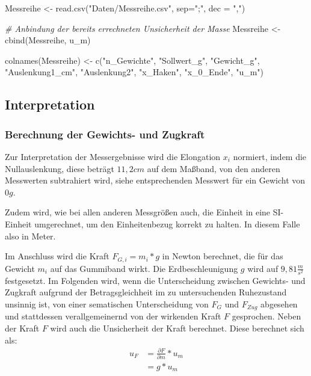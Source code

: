 \documentclass[
]{article}
\newenvironment{Shaded}{\begin{snugshade}}{\end{snugshade}}
\newcommand{\AttributeTok}[1]{\textcolor[rgb]{0.77,0.63,0.00}{#1}}
\newcommand{\CommentTok}[1]{\textcolor[rgb]{0.56,0.35,0.01}{\textit{#1}}}
\newcommand{\FunctionTok}[1]{\textcolor[rgb]{0.00,0.00,0.00}{#1}}
\newcommand{\NormalTok}[1]{#1}
\newcommand{\OtherTok}[1]{\textcolor[rgb]{0.56,0.35,0.01}{#1}}
\newcommand{\StringTok}[1]{\textcolor[rgb]{0.31,0.60,0.02}{#1}}
\begin{document}
\begin{Shaded}
\begin{Highlighting}[]
\NormalTok{Messreihe }\OtherTok{\textless{}{-}} \FunctionTok{read.csv}\NormalTok{(}\StringTok{"Daten/Messreihe.csv"}\NormalTok{, }\AttributeTok{sep=}\StringTok{";"}\NormalTok{, }\AttributeTok{dec =} \StringTok{","}\NormalTok{)}

\CommentTok{\# Anbindung der bereits errechneten Unsicherheit der Masse}
\NormalTok{Messreihe }\OtherTok{\textless{}{-}} \FunctionTok{cbind}\NormalTok{(Messreihe, u\_m)}

\FunctionTok{colnames}\NormalTok{(Messreihe) }\OtherTok{\textless{}{-}} \FunctionTok{c}\NormalTok{(}\StringTok{"n\_Gewichte"}\NormalTok{, }\StringTok{"Sollwert\_g"}\NormalTok{, }\StringTok{"Gewicht\_g"}\NormalTok{, }\StringTok{"Auslenkung1\_cm"}\NormalTok{,  }\StringTok{"Auslenkung2"}\NormalTok{, }\StringTok{"x\_Haken"}\NormalTok{, }\StringTok{"x\_0\_Ende"}\NormalTok{, }\StringTok{"u\_m"}\NormalTok{)}
\end{Highlighting}
\end{Shaded}

\hypertarget{interpretation}{%
\subsection{Interpretation}\label{interpretation}}

\hypertarget{berechnung-der-gewichts--und-zugkraft}{%
\subsubsection{Berechnung der Gewichts- und
Zugkraft}\label{berechnung-der-gewichts--und-zugkraft}}

Zur Interpretation der Messergebnisse wird die Elongation \(x_i\)
normiert, indem die Nullauslenkung, diese beträgt \(11,2 cm\) auf dem
Maßband, von den anderen Messwerten subtrahiert wird, siehe
entsprechenden Messwert für ein Gewicht von \(0g\).

Zudem wird, wie bei allen anderen Messgrößen auch, die Einheit in eine
SI-Einheit umgerechnet, um den Einheitenbezug korrekt zu halten. In
diesem Falle also in Meter.

Im Anschluss wird die Kraft \(F_{G,i} = m_i * g\) in Newton berechnet,
die für das Gewicht \(m_i\) auf das Gummiband wirkt. Die
Erdbeschleunigung \(g\) wird auf \(9,81\frac{m}{s^2}\) festgesetzt. Im
Folgenden wird, wenn die Unterscheidung zwischen Gewichts- und Zugkraft
aufgrund der Betragsgleichheit im zu untersuchenden Ruhezustand unsinnig
ist, von einer sematischen Unterscheidung von \(F_G\) und \(F_{Zug}\)
abgesehen und stattdessen verallgemeinernd von der wirkenden Kraft \(F\)
gesprochen. Neben der Kraft \(F\) wird auch die Unsicherheit der Kraft
berechnet. Diese berechnet sich als: \begin{equation}
\begin{split}
u_F &= \frac{\partial F}{\partial {m}}*u_m\\
    &= g*u_m\\
\end{split}
\end{equation}
\end{document}
